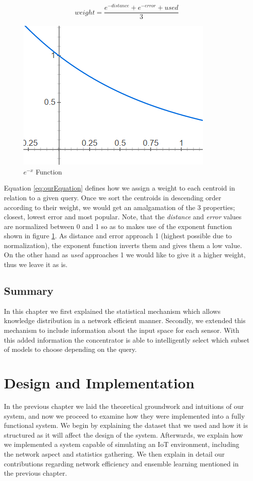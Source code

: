 \documentclass{mproj}
\begin{document}
\begin{equation}
\label{eq:ourEquation}
weight=\frac{e^{-distance} + e^{-error} + used}{3}
\end{equation}

\begin{figure}[H]
\caption{$e^{-x}$ Function}
\label{fig:e-x}
\centerline{\includegraphics[scale=0.6]{e-x}}
\end{figure}

Equation \ref{eq:ourEquation} defines how we assign a weight to each centroid in relation to a given query. Once we sort the centroids in descending order according to their weight, we would get an amalgamation of the 3 properties; closest, lowest error and most popular. Note, that the \textit{distance} and \textit{error} values are normalized between 0 and 1 so as to makes use of the exponent function shown in figure \ref{fig:e-x}. As distance and error approach 1 (highest possible due to normalization), the exponent function inverts them and gives them a low value. On the other hand as \textit{used} approaches 1 we would like to give it a higher weight, thus we leave it as is.

\section{Summary}
In this chapter we first explained the statistical mechanism which allows knowledge distribution in a network efficient manner. Secondly, we extended this mechanism to include information about the input space for each sensor. With this added information the concentrator is able to intelligently select which subset of models to choose depending on the query.

\chapter{Design and Implementation}
In the previous chapter we laid the theoretical groundwork and intuitions of our system, and now we proceed to examine how they were implemented into a fully functional system. We begin by explaining the dataset that we used and how it is structured as it will affect the design of the system. Afterwards, we explain how we implemented a system capable of simulating an IoT environment, including the network aspect and statistics gathering. We then explain in detail our contributions regarding network efficiency and ensemble learning mentioned in the previous chapter.
\end{document}
